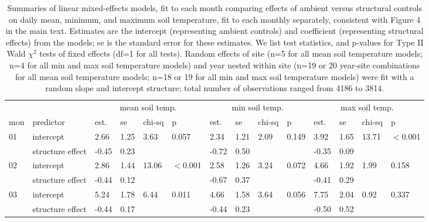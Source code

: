 \documentclass{article}
\begin{document}
\begin{table}[ht]
\centering
\caption{Summaries of linear mixed-effects models, fit to each month comparing effects of ambient versus structural controls on daily mean, minimum, and maximum soil temperature, fit to each monthly separately, consistent with Figure 4 in the main text. Estimates are the intercept (representing ambient controls) and coefficient (representing structural effects) from the models; se is the standard error for these estimates. We list test statistics, and p-values for Type II Wald $\chi^{2}$ tests of fixed effects (df=1 for all tests). Random effects of site (n=5 for all mean soil temperature models; n=4 for all min and max soil temperature models) and year nested within site (n=19 or 20 year-site combinations for all mean soil temperature models; n=18 or 19 for all min and max soil temperature models) were fit with a random slope and intercept structure; total number of observations ranged from 4186 to 3814.} 
\label{table:shamamb_stempm}
\begin{tabular}{|p{}|p{}|p{}p{}p{}p{}|p{}p{}p{}p{}|p{}p{}p{}p{}|}
  \hline
  & &\multicolumn{4}{c}{mean soil temp.} &\multicolumn{4}{c}{min soil temp.} &\multicolumn{4}{c}{max soil temp.}\\
 mon & predictor & est. & se & chi-sq & p & est. & se & chi-sq & p & est. & se & chi-sq & p\\
 \hline
01 & intercept & 2.66 & 1.25 & 3.63 & 0.057 & 2.34 & 1.21 & 2.09 & 0.149 & 3.92 & 1.65 & 13.71 & $<$0.001 \\ 
    & structure effect & -0.45 & 0.23 &  &  & -0.72 & 0.50 &  &  & -0.35 & 0.09 &  &  \\ 
   \hline
02 & intercept & 2.86 & 1.44 & 13.06 & $<$0.001 & 2.58 & 1.26 & 3.24 & 0.072 & 4.66 & 1.92 & 1.99 & 0.158 \\ 
    & structure effect & -0.44 & 0.12 &  &  & -0.67 & 0.37 &  &  & -0.41 & 0.29 &  &  \\ 
   \hline
03 & intercept & 5.24 & 1.78 & 6.44 & 0.011 & 4.66 & 1.58 & 3.64 & 0.056 & 7.75 & 2.04 & 0.92 & 0.337 \\ 
    & structure effect & -0.44 & 0.17 &  &  & -0.44 & 0.23 &  &  & -0.50 & 0.52 &  &  \\ 

\end{tabular}
\end{table}
\end{document}
